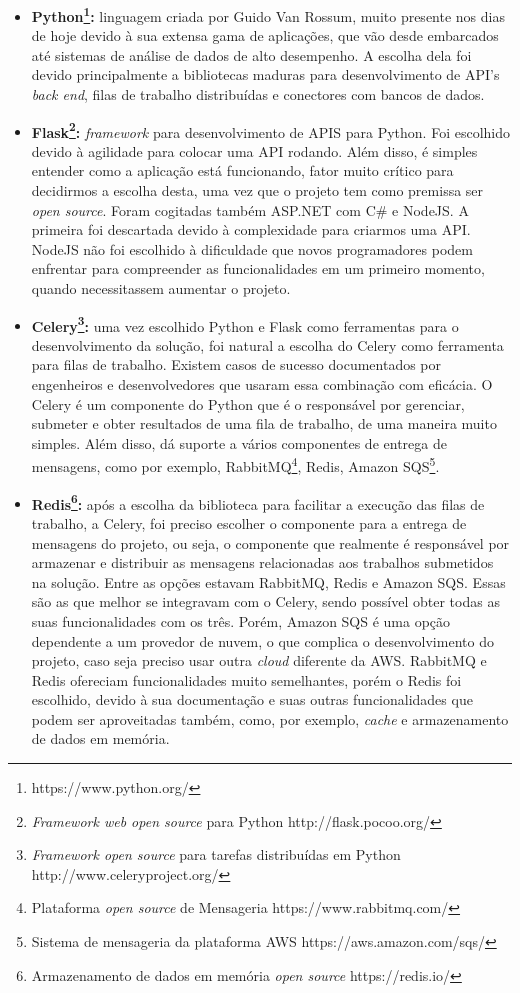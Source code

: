 \documentclass[11pt,twoside]{article}
\begin{document}
\begin{itemize}
  \item \textbf{Python\footnote{https://www.python.org/}:} linguagem criada por Guido Van Rossum, muito presente nos dias de hoje devido à sua extensa gama de aplicações, que vão desde embarcados até sistemas de análise de dados de alto 
  desempenho. A escolha dela foi devido principalmente a bibliotecas maduras para desenvolvimento de API's \emph{back end}, filas de trabalho distribuídas e conectores com bancos de dados.

  \item \textbf{Flask\footnote{\emph{Framework web open source} para Python http://flask.pocoo.org/}:} \emph{framework} para desenvolvimento de APIS para Python. Foi escolhido devido à agilidade para colocar uma API rodando. Além disso, é simples entender como a aplicação está funcionando,
  fator muito crítico para decidirmos a escolha desta, uma vez que o projeto tem como premissa ser \emph{open source}. Foram cogitadas também ASP.NET
  com C\# e NodeJS. A primeira foi descartada devido à complexidade para criarmos uma API. NodeJS não foi escolhido à dificuldade que novos programadores podem enfrentar para compreender as
  funcionalidades em um primeiro momento, quando necessitassem aumentar o projeto.

  \item \textbf{Celery\footnote{\emph{Framework open source} para tarefas distribuídas em Python http://www.celeryproject.org/}:} uma vez escolhido Python e Flask como ferramentas para o desenvolvimento da solução, foi natural a escolha do Celery como ferramenta para filas de trabalho. Existem
  casos de sucesso documentados por engenheiros e desenvolvedores que usaram essa combinação com eficácia. O Celery é um componente do Python que é o responsável por gerenciar, submeter e obter
  resultados de uma fila de trabalho, de uma maneira muito simples. Além disso, dá suporte a vários componentes de entrega de mensagens, como por exemplo, RabbitMQ\footnote{Plataforma \emph{open source} de Mensageria https://www.rabbitmq.com/}, 
  Redis, Amazon SQS\footnote{Sistema de mensageria da plataforma AWS https://aws.amazon.com/sqs/}.  

  \item \textbf{Redis\footnote{Armazenamento de dados em memória \emph{open source} https://redis.io/}:} após a escolha da biblioteca para facilitar a execução das filas de trabalho, a Celery, foi preciso escolher o componente para a entrega de mensagens do projeto, ou seja, o
  componente que realmente é responsável por armazenar e distribuir as mensagens relacionadas aos trabalhos submetidos na solução. Entre as opções estavam RabbitMQ, Redis e Amazon SQS. Essas são as que melhor se 
  integravam com o Celery, sendo possível obter todas as suas funcionalidades com os três. Porém, Amazon SQS é uma opção dependente a um provedor de nuvem, o que complica o desenvolvimento do projeto, caso seja 
  preciso usar outra \emph{cloud} diferente da AWS. RabbitMQ e Redis ofereciam funcionalidades muito semelhantes, porém o Redis foi escolhido, devido à sua documentação e suas outras funcionalidades
  que podem ser aproveitadas também, como, por exemplo, \emph{cache} e armazenamento de dados em memória.


\end{itemize}
\end{document}
